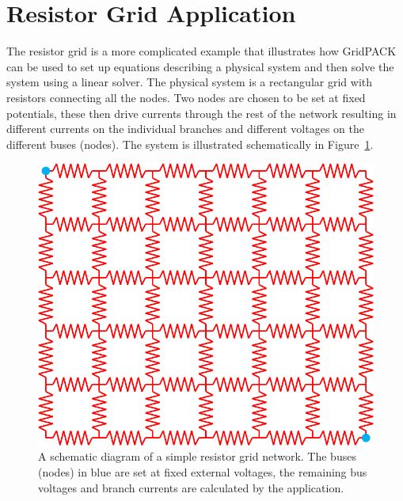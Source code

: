 \section{Resistor Grid Application}

The resistor grid is a more complicated example that illustrates how GridPACK can be used to set up equations describing a physical system and then solve the system using a linear solver. The physical system is a rectangular grid with resistors connecting all the nodes. Two nodes are chosen to be set at fixed potentials, these then drive currents through the rest of the network resulting in different currents on the individual branches and different voltages on the different buses (nodes). The system is illustrated schematically in Figure~\ref{fig:fig-14}.

\begin{figure}
  \centering
    \includegraphics*[width=5in, keepaspectratio=true]{Fig14}
  \caption{A schematic diagram of a simple resistor grid network. The buses (nodes) in blue are set at fixed external voltages, the remaining bus voltages and branch currents are calculated by the application.}
  \label{fig:fig-14}
\end{figure}




